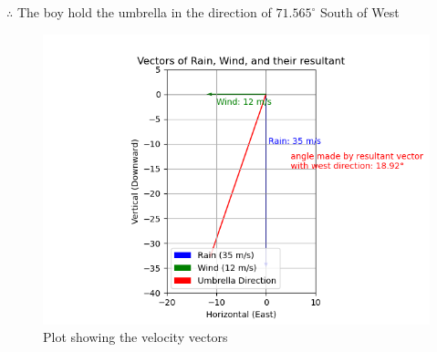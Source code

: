 \documentclass[journal]{IEEEtran}
\begin{document}
 $\therefore$ The boy hold the umbrella in the direction of $71.565^\circ$ South of West\\

 \begin{figure}[h!]
   \centering
   \includegraphics[width=0.7\linewidth]{figs/figure1.png.jpg}
   \caption{Plot showing the velocity vectors}
   \label{stemplot}
\end{figure}
\end{document}

